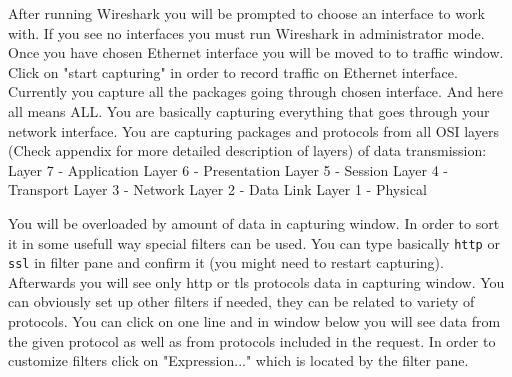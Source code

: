 After running Wireshark you will be prompted to choose an interface to work with.
If you see no interfaces you must run Wireshark in administrator mode.
Once you have chosen Ethernet interface you will be moved to to traffic window.
Click on "start capturing" in order to record traffic on Ethernet interface.
Currently you capture all the packages going through chosen interface.
And here all means ALL.
You are basically capturing everything that goes through your network interface.
You are capturing packages and protocols from all OSI layers (Check appendix for more detailed description of layers) of data transmission: \newline \newline
Layer 7 - Application \newline
Layer 6 - Presentation \newline
Layer 5 - Session \newline
Layer 4 - Transport \newline
Layer 3 - Network \newline
Layer 2 - Data Link \newline
Layer 1 - Physical \newline


You will be overloaded by amount of data in capturing window.
In order to sort it in some usefull way special filters can be used.
You can type basically \texttt{http} or \texttt{ssl} in filter pane and confirm it (you might need to restart capturing).
Afterwards you will see only http or tls protocols data in capturing window.
You can obviously set up other filters if needed, they can be related to variety of protocols.
You can click on one line and in window below you will see data from the given protocol as well as from protocols included in the request.
In order to customize filters click on "Expression..." which is located by the filter pane.

